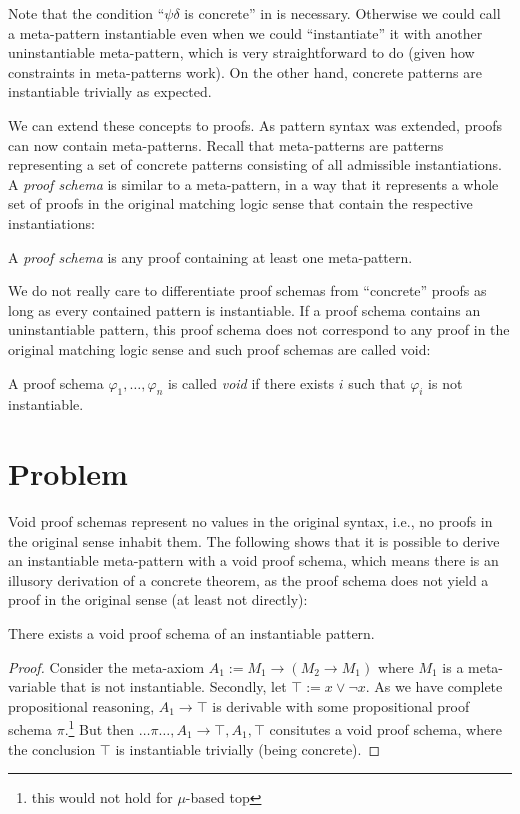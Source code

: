 \documentclass{mgr}
\begin{document}
Note that the condition ``$\psi\delta$ is concrete'' in  is necessary.
Otherwise we could call a meta-pattern instantiable even when we could ``instantiate'' it with another uninstantiable meta-pattern, which is very straightforward to do (given how constraints in meta-patterns work).
On the other hand, concrete patterns are instantiable trivially as expected.

We can extend these concepts to proofs.
As pattern syntax was extended, proofs can now contain meta-patterns.
Recall that meta-patterns are patterns representing a set of concrete patterns consisting of all admissible instantiations.
A \emph{proof schema} is similar to a meta-pattern, in a way that it represents a whole set of proofs in the original matching logic sense that contain the respective instantiations:
\begin{definition}
  A \emph{proof schema} is any proof containing at least one meta-pattern.
\end{definition}

We do not really care to differentiate proof schemas from ``concrete'' proofs as long as every contained pattern is instantiable.
If a proof schema contains an uninstantiable pattern, this proof schema does not correspond to any proof in the original matching logic sense and such proof schemas are called void:
\begin{definition}
  A proof schema $\varphi_1, \ldots, \varphi_n$ is called \emph{void} if there exists $i$ such that $\varphi_i$ is not instantiable.
\end{definition}

\section{Problem}

Void proof schemas represent no values in the original \ML syntax, i.e., no \ML proofs in the original sense inhabit them.
The following shows that it is possible to derive an instantiable meta-pattern with a void proof schema, which means there is an illusory \ML  derivation of a concrete theorem, as the proof schema does not yield a \ML proof in the original sense (at least not directly):
\begin{proposition*}
  There exists a void proof schema of an instantiable pattern.
  \begin{proof}
    Consider the meta-axiom $A_1 := M_1 \to (M_2 \to M_1)$ where $M_1$ is a meta-variable that is not instantiable.
    Secondly, let $\top := x \lor \neg x$.
    As we have complete propositional reasoning, $A_1 \to \top$ is derivable with some propositional proof schema $\pi$.\footnote{this would not hold for $\mu$-based top}
    But then $\ldots\pi\ldots, A_1 \to \top, A_1, \top$ consitutes a void proof schema, where the conclusion $\top$ is instantiable trivially (being concrete).
  \end{proof}
\end{proposition*}
\end{document}
